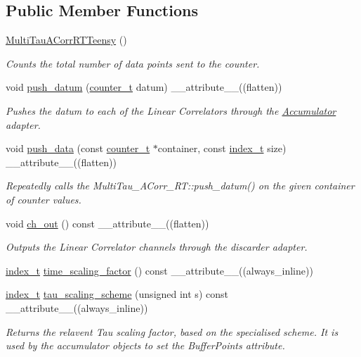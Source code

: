 \subsection*{Public Member Functions}
\begin{DoxyCompactItemize}
\item 
\hyperlink{classMultiTauACorrRTTeensy_a46b73c98f07f536603a8f5b2b3174d91}{Multi\+Tau\+A\+Corr\+R\+T\+Teensy} ()
\begin{DoxyCompactList}\small\item\em Counts the total number of data points sent to the counter. \end{DoxyCompactList}\item 
void \hyperlink{classMultiTauACorrRTTeensy_a85777a221b7a15de34b252ed804ab0f8}{push\+\_\+datum} (\hyperlink{types_8hpp_a22f279793847eba127de149437848c48}{counter\+\_\+t} datum) \+\_\+\+\_\+attribute\+\_\+\+\_\+((flatten))
\begin{DoxyCompactList}\small\item\em Pushes the datum to each of the Linear Correlators through the \hyperlink{classAccumulator}{Accumulator} adapter. \end{DoxyCompactList}\item 
void \hyperlink{classMultiTauACorrRTTeensy_ad3c078b834bb1682c93ba4cd5639d450}{push\+\_\+data} (const \hyperlink{types_8hpp_a22f279793847eba127de149437848c48}{counter\+\_\+t} $\ast$container, const \hyperlink{types_8hpp_ab41b824af8e088d090c0b9e60f536c9d}{index\+\_\+t} size) \+\_\+\+\_\+attribute\+\_\+\+\_\+((flatten))
\begin{DoxyCompactList}\small\item\em Repeatedly calls the Multi\+Tau\+\_\+\+A\+Corr\+\_\+\+R\+T\+::push\+\_\+datum() on the given container of counter values. \end{DoxyCompactList}\item 
void \hyperlink{classMultiTauACorrRTTeensy_af9ab6f055c1efc4a28c7c5bfa3aea074}{ch\+\_\+out} () const \+\_\+\+\_\+attribute\+\_\+\+\_\+((flatten))
\begin{DoxyCompactList}\small\item\em Outputs the Linear Correlator channels through the discarder adapter. \end{DoxyCompactList}\item 
\hyperlink{types_8hpp_ab41b824af8e088d090c0b9e60f536c9d}{index\+\_\+t} \hyperlink{classMultiTauACorrRTTeensy_a56fbc9bf757ac74e0dad862ec45def82}{time\+\_\+scaling\+\_\+factor} () const \+\_\+\+\_\+attribute\+\_\+\+\_\+((always\+\_\+inline))
\item 
\hyperlink{types_8hpp_ab41b824af8e088d090c0b9e60f536c9d}{index\+\_\+t} \hyperlink{classMultiTauACorrRTTeensy_a1a677c901b40aecdd00a4f2135d8c2bb}{tau\+\_\+scaling\+\_\+scheme} (unsigned int s) const \+\_\+\+\_\+attribute\+\_\+\+\_\+((always\+\_\+inline))
\begin{DoxyCompactList}\small\item\em Returns the relavent Tau scaling factor, based on the specialised scheme. It is used by the accumulator objects to set the Buffer\+Points attribute. \end{DoxyCompactList}\end{DoxyCompactItemize}
